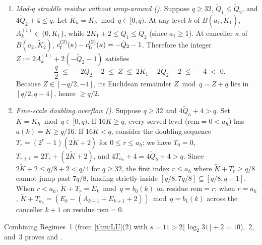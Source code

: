 \begin{outline}
\begin{enumerate}
\item \emph{Mod-$q$ straddle residue without wrap-around ().} Suppose $q \ge 32$,
  $\tilde{Q}_1 \le \tilde{Q}_2$, and $4\tilde{Q}_2 + 4 \le q$. Let $\tilde{K}_h = K_h \bmod q \in [0, q)$. At any level $k$
  of $B(a_1, \tilde{K}_1)$, $A^{(1)}_k \in \{0, \tilde{K}_1\}$, while $2\tilde{K}_1 + 2 \le \tilde{Q}_1 \le \tilde{Q}_2$
  (since $a_1 \ge 1$). At canceller $\kappa$ of $B(a_2, \tilde{K}_2)$, $c_{\mathrm{f}}^{(2)}(\kappa) - c_{\mathrm{b}}^{(2)}(\kappa) =
  -\tilde{Q}_2 - 1$. Therefore the integer $Z := 2 A^{(1)}_k + 2(-\tilde{Q}_2 - 1)$ satisfies
  \[
    -\frac{q}{2} \;\le\; -2\tilde{Q}_2 - 2 \;\le\; Z \;\le\; 2\tilde{K}_1 - 2\tilde{Q}_2 - 2 \;\le\; -4 \;<\; 0.
  \]
  Because $Z \in [-q/2, -1]$, its Euclidean remainder $Z \bmod q = Z + q$ lies in $[q/2, q - 4]$, hence $\ge q/2$.
\item \emph{Fine-scale doubling overflow ().} Suppose $q \ge 32$ and $4\tilde{Q}_h + 4 > q$.
  Set $\tilde{K} = K_h \bmod q \in [0, q)$. If $16\tilde{K} \ge q$, every served level ($\mathrm{rem} = 0 < a_h$) has
  $a(k) = \tilde{K} \ge q/16$. If $16\tilde{K} < q$, consider the doubling sequence
  $T_r = (2^r - 1)(2\tilde{K} + 2)$ for $0 \le r \le a_h$: we have $T_0 = 0$, $T_{r+1} = 2 T_r + (2\tilde{K} + 2)$, and
  $4 T_{a_h} + 4 = 4\tilde{Q}_h + 4 > q$. Since $2\tilde{K} + 2 \le q/8 + 2 < q/4$ for $q \ge 32$, the first index $r \le
  a_h$ where $\tilde{K} + T_r \ge q/8$ cannot jump past $7q/8$, landing strictly inside $[q/8, 7q/8] \subseteq [q/8, q - 1]$.
  When $r < a_h$, $\tilde{K} + T_r = E_k \bmod q = b_0(k)$ on residue $\mathrm{rem} = r$; when $r = a_h$, $\tilde{K} +
  T_{a_h} = (E_k - (A_{k+1} + E_{k+1} + 2)) \bmod q = b_1(k)$ across the canceller $k + 1$ on residue $\mathrm{rem} = 0$.
\end{enumerate}
Combining Regimes~1 (from \cref{thm:LU}(2) with $s = 11 > 2\lfloor\log_2 31\rfloor + 2 = 10$),~2, and~3 proves
 and .
\end{outline}

